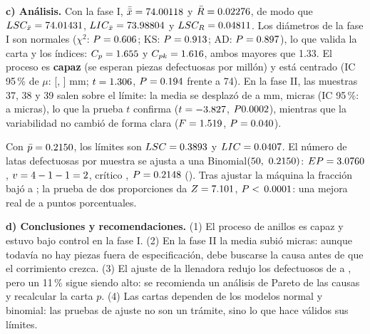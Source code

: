 \documentclass[11pt]{article}
\begin{document}
\textbf{c) Análisis.} Con la fase I, $\bar{\bar x}=74.00118$ y $\bar R=0.02276$, de modo que $LSC_{\bar x}=74.01431$,
$LIC_{\bar x}=73.98804$ y $LSC_R=0.04811$.
Los diámetros de la fase I son normales ($\chi^2$: $P=0.606$; KS: $P=0.913$; AD: $P=0.897$), lo que valida la
carta y los índices: $C_p=1.655$ y $C_{pk}=1.616$, ambos mayores que 1.33. El proceso es \textbf{capaz} (se
esperan \anPpm{} piezas defectuosas por millón) y está centrado (IC 95\,\% de $\mu$: [\anIcLi, \anIcLs] mm;
$t=1.306$, $P=0.194$ frente a 74). En la fase II, las muestras 37, 38 y 39 salen sobre el límite: la media se
desplazó de \faMuno{} a \faMdos{} mm, \faMicras{} micras (IC 95\,\%: \faIcLi{} a \faIcLs{} micras), lo que la prueba
$t$ confirma ($t=-3.827$, $P0.0002$), mientras que la variabilidad no cambió de forma clara ($F=1.519$, $P=0.040$).
\begin{minipage}{0.48\linewidth}
Con $\bar p=0.2150$, los límites son $LSC=0.3893$ y $LIC=0.0407$. El número de latas defectuosas por muestra se
ajusta a una Binomial$(50,\ \juBp)$: $EP=3.0760$, $v=4-1-1=2$, crítico \juCrit, $P=0.2148$ (\norechaza).
Tras ajustar la máquina la fracción bajó a \juPdos; la prueba de dos proporciones da $Z=7.101$, $P<\,0.0001$: una mejora
real de \juIcLi{} a \juIcLs{} puntos porcentuales.
\end{minipage}\hfill
\begin{minipage}{0.48\linewidth}\centering{\footnotesize\sans}\end{minipage}

\begin{lectura}
\textbf{d) Conclusiones y recomendaciones.} (1) El proceso de anillos es capaz y estuvo bajo control en la fase I.
(2) En la fase II la media subió \faMicras{} micras: aunque todavía no hay piezas fuera de especificación, debe
buscarse la causa antes de que el corrimiento crezca. (3) El ajuste de la llenadora redujo los defectuosos de
\juPbar{} a \juPdos, pero un 11\,\% sigue siendo alto: se recomienda un análisis de Pareto de las causas y
recalcular la carta $p$. (4) Las cartas dependen de los modelos normal y binomial: las pruebas de ajuste no son un
trámite, sino lo que hace válidos sus límites.
\end{lectura}

\end{document}

